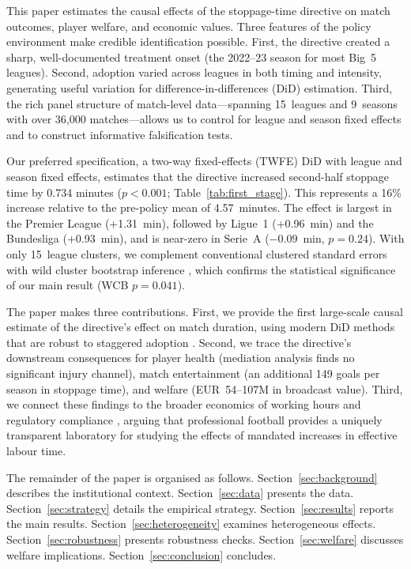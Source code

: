 \documentclass[12pt]{article}
\begin{document}
This paper estimates the causal effects of the stoppage-time directive
on match outcomes, player welfare, and economic values. Three features of
the policy environment make credible identification possible. First, the
directive created a sharp, well-documented treatment onset (the 2022--23
season for most Big~5 leagues). Second, adoption varied across leagues in
both timing and intensity, generating useful variation for
difference-in-differences (DiD) estimation. Third, the rich panel
structure of match-level data---spanning 15~leagues and 9~seasons with
over 36,000 matches---allows us to control for league and season fixed
effects and to construct informative falsification tests.

Our preferred specification, a two-way fixed-effects (TWFE) DiD with
league and season fixed effects, estimates that the directive increased
second-half stoppage time by 0.734 minutes ($p < 0.001$;
Table~\ref{tab:first_stage}). This represents a 16\% increase relative
to the pre-policy mean of 4.57~minutes. The effect is largest in the
Premier League (+1.31~min), followed by Ligue~1 (+0.96~min) and the
Bundesliga (+0.93~min), and is near-zero in Serie~A ($-0.09$~min,
$p = 0.24$). With only 15~league clusters, we complement conventional
clustered standard errors with wild cluster bootstrap inference
\citep{cameron2008bootstrap, webb2023reworking}, which confirms the
statistical significance of our main result (WCB $p = 0.041$).

The paper makes three contributions. First, we provide the first
large-scale causal estimate of the directive's effect on match duration,
using modern DiD methods that are robust to staggered adoption
\citep{callaway2021difference, sunab2021estimating, goodmanbacon2021difference}.
Second, we trace the directive's downstream consequences for player
health (mediation analysis finds no significant injury channel), match
entertainment (an additional 149 goals per season in stoppage time), and
welfare (EUR~54--107M in broadcast value).
Third, we connect these findings to the broader economics of working
hours \citep{pencavel2015effects, dembe2005effect} and regulatory
compliance \citep{johnson2020compliance, levine2012randomized}, arguing
that professional football provides a uniquely transparent laboratory
for studying the effects of mandated increases in effective labour time.

The remainder of the paper is organised as follows.
Section~\ref{sec:background} describes the institutional context.
Section~\ref{sec:data} presents the data.
Section~\ref{sec:strategy} details the empirical strategy.
Section~\ref{sec:results} reports the main results.
Section~\ref{sec:heterogeneity} examines heterogeneous effects.
Section~\ref{sec:robustness} presents robustness checks.
Section~\ref{sec:welfare} discusses welfare implications.
Section~\ref{sec:conclusion} concludes.
\end{document}
